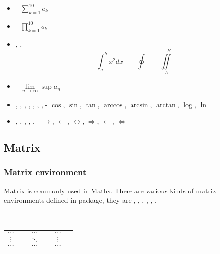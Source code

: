 \begin{frame}
	\begin{itemize}
		\item {} - $\sum\limits_{k=1}^{10}a_k$
		\item {} - $\prod\limits_{k=1}^{10}a_k$
		\item {},  , - $$\int_a^bx^2dx\qquad\oint\qquad\iint\limits_A^{\quad B}$$
		\item {} - $\lim\limits_{n\to\infty}\sup a_n$
		\item {}, , , , , , ,  - $\cos$, $\sin$, $\tan$, $\arccos$, $\arcsin$, $\arctan$, $\log$, $\ln$
		\item {}, , , , ,  - $\rightarrow$, $\leftarrow$, $\leftrightarrow$, $\Rightarrow$, $\longleftarrow$, $\Longleftrightarrow$
	\end{itemize}
\end{frame}

\subsection{Matrix}

\begin{frame}
	\frametitle{Matrix environment}
	Matrix is commonly used in Maths. There are various kinds of matrix environments defined in  package, they are , , , , , .
	\begin{command}
		\\
		\qquad \begin{tabular}{cccccc}
			$\cdots$ & \structure{\&} & $\cdots$ & \structure{\&} & $\cdots$ & \samplecommand{\textbackslash} \\
			$\vdots$ & \structure{\&} & $\ddots$ & \structure{\&} & $\vdots$ & \samplecommand{\textbackslash} \\
			$\cdots$ & \structure{\&} & $\cdots$ & \structure{\&} & $\cdots$ & \samplecommand{\textbackslash} \\
		\end{tabular}\\
		\\
	\end{command}	
\end{frame}

